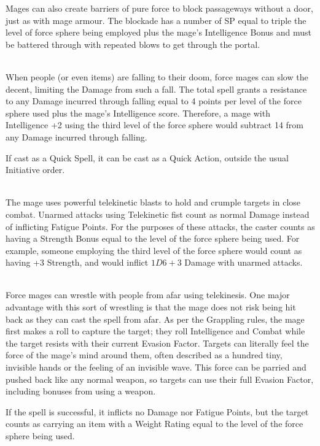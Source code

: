 \documentclass[titlepage,a4paper,openany]{book}
\begin{document}
\begin{multicols}{2}
Mages can also create barriers of pure force to block passageways without a door, just as with mage armour. The blockade has a number of \gls{SP} equal to triple the level of force sphere being employed plus the mage's Intelligence Bonus and must be battered through with repeated blows to get through the portal.

\\
When people (or even items) are falling to their doom, force mages can slow the decent, limiting the Damage from such a fall. The total spell grants a resistance to any Damage incurred through falling equal to 4 points per level of the force sphere used plus the mage's Intelligence score. Therefore, a mage with Intelligence +2 using the third level of the force sphere would subtract 14 from any Damage incurred through falling.

If cast as a Quick Spell, it can be cast as a Quick Action, outside the usual Initiative order.

\\
The mage uses powerful telekinetic blasts to hold and crumple targets in close combat. Unarmed attacks using Telekinetic fist count as normal Damage instead of inflicting Fatigue Points. For the purposes of these attacks, the caster counts as having a Strength Bonus equal to the level of the force sphere being used. For example, someone employing the third level of the force sphere would count as having +3 Strength, and would inflict $1D6+3$ Damage with unarmed attacks.

\\
Force mages can wrestle with people from afar using telekinesis. One major advantage with this sort of wrestling is that the mage does not risk being hit back as they can cast the spell from afar. As per the Grappling rules, the mage first makes a roll to capture the target; they roll Intelligence and Combat while the target resists with their current Evasion Factor. Targets can literally feel the force of the mage's mind around them, often described as a hundred tiny, invisible hands or the feeling of an invisible wave. This force can be parried and pushed back like any normal weapon, so targets can use their full Evasion Factor, including bonuses from using a weapon.

If the spell is successful, it inflicts no Damage nor Fatigue Points, but the target counts as carrying an item with a Weight Rating equal to the level of the force sphere being used.


\end{multicols}
\end{document}
